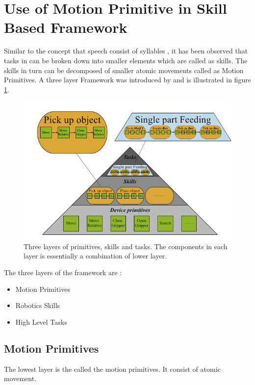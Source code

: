 \section{Use of Motion Primitive in Skill Based Framework}
\label{apx:skill based framework}
Similar to the concept that speech consist of syllables , it has been observed
that tasks in can be broken down into smaller elements which are called as
skills. The skills in turn can be decomposed of smaller atomic movements called
as Motion Primitives. A  three layer Framework was introduced by
\cite{pedersen_robot_2015} and is illustrated in figure \ref{skill framework}.



\begin{figure}[htp]
\centering
\includegraphics[scale=0.5]{images/skill_framework.png}
\caption[Skill based framework]{Three layers of primitives, skills and tasks. The components in each layer is essentially a combination of lower layer. \cite{pedersen_robot_2015}}
\label{skill framework}
\end{figure}

The three layers of the framework are :
\begin{itemize}
    \item Motion Primitives
    \item Robotics Skills
    \item High Level Tasks
\end{itemize}

\subsection{Motion Primitives}
The lowest layer is the called the motion primitives. It consist of atomic
movement.

